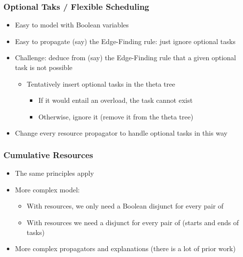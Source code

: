 \begin{frame}
\frametitle{Optional Taks / Flexible Scheduling}

\begin{itemize}
	\item Easy to model with Boolean variables

	\vfill\pause
	\item Easy to propagate (say) the Edge-Finding rule: just ignore optional tasks

	\vfill\pause
	\item Challenge: deduce from (say) the Edge-Finding rule that a given optional task is not possible

	\vfill\pause
	\begin{itemize}
		\item Tentatively insert optional tasks in the theta tree

		\vfill
		\begin{itemize}
			\item If it would entail an overload, the task cannot exist

			\vfill
			\item Otherwise, ignore it (remove it from the theta tree)
		\end{itemize}
	\end{itemize}

	\vfill\pause
	\item Change every resource propagator to handle optional tasks in this way
\end{itemize}

\end{frame}




\begin{frame}
\frametitle{Cumulative Resources}

\vfill\pause

\begin{itemize}
	\item The same principles apply

	\vfill
	\item More complex model:

	\vfill\pause
	\begin{itemize}
		\item With  resources, we only need a Boolean disjunct for every pair of 

		\vfill
		\item With  resources we need a disjunct for every pair of  (starts and ends of tasks)
	\end{itemize}

	\vfill\pause
	\item More complex propagators and explanations (there is a lot of prior work)

\end{itemize}

\vfill

\end{frame}




